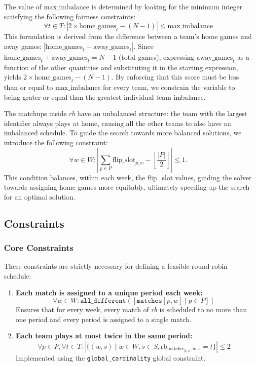 The value of $\text{max\_imbalance}$ is determined by looking for the minimum integer satisfying the following fairness constraints:
\[ \forall t \in T : \left| 2 \times \text{home\_games}_{t} - (N-1) \right| \leq \text{max\_imbalance} \]
This formulation is derived from the difference between a team's home games and away games: $|\text{home\_games}_t - \text{away\_games}_t|$. Since \\ $\text{home\_games}_{t} + \text{away\_games}_{t} = N-1$ (total games), expressing $\text{away\_games}_t$ as a function of the other quantities and substituting it in the starting expression, yields $2 \times \text{home\_games}_{t} - (N-1)$. 
By enforcing that this score must be less than or equal to $\text{max\_imbalance}$ for every team, we constrain the variable to being grater or equal than the greatest individual team imbalance.

The matchups inside $rb$ have an unbalanced structure: the team with the largest identifier always plays at home, causing all the other teams to also have an imbalanced schedule. To guide the search towards more balanced solutions, we introduce the following constraint:
\[
\forall w \in W : \left| \sum_{p \in P} \text{flip\_slot}_{p, w} - \left\lfloor \frac{|P|}{2} \right\rfloor \right| \leq 1.
\]
This condition balances, within each week, the flip\_slot values, guiding the solver towards assigning home games more equitably, ultimately speeding up the search for an optimal solution.

\subsection{Constraints}
\subsubsection{Core Constraints}
These constraints are strictly necessary for defining a feasible round-robin schedule:
\begin{enumerate}
    \item \textbf{Each match is assigned to a unique period each week:} 
    \[ \forall w \in W : \texttt{all\_different}([\texttt{matches}[p, w] \mid p \in P]) \]
    Ensures that for every week, every match of $rb$ is scheduled to no more than one period and every period is assigned to a single match. 

    \item \textbf{Each team plays at most twice in the same period:} 
\[ \forall p \in P, \forall t \in T : \left| \{ (w, s) \mid w \in W, s \in S, \text{rb}_{\text{matches}_{p, w}, w, s} = t \} \right| \leq 2 \]
Implemented using the \texttt{global\_cardinality} global constraint.

\end{enumerate}

